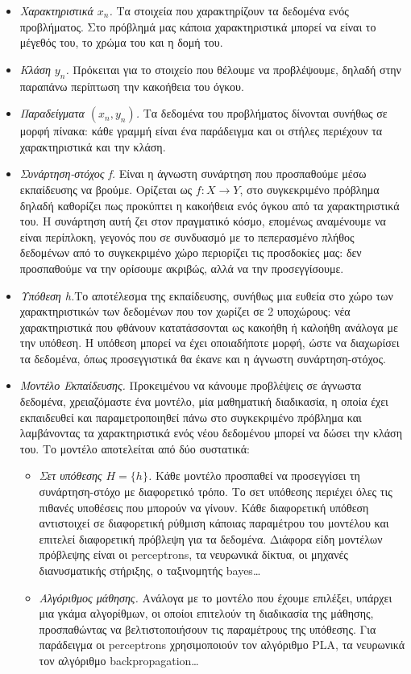 \documentclass{article}
\begin{document}
\begin{itemize}
\item \textit{Χαρακτηριστικά $x_n$.} Τα στοιχεία που χαρακτηρίζουν τα δεδομένα ενός προβλήματος. Στο πρόβλημά μας κάποια χαρακτηριστικά μπορεί να είναι το μέγεθός του, το χρώμα του και η δομή του.
\item \textit{Κλάση $y_n$.} Πρόκειται για το στοιχείο που θέλουμε να προβλέψουμε, δηλαδή στην παραπάνω περίπτωση την κακοήθεια του όγκου.
\item \textit{Παραδείγματα $(x_n, y_n)$.} Τα δεδομένα του προβλήματος δίνονται συνήθως σε μορφή πίνακα: κάθε γραμμή είναι ένα παράδειγμα και οι στήλες περιέχουν τα χαρακτηριστικά και την κλάση.
\item \textit{Συνάρτηση-στόχος f. }Είναι η άγνωστη συνάρτηση που προσπαθούμε μέσω εκπαίδευσης να βρούμε. Ορίζεται ως $f : X \rightarrow Y $, στο συγκεκριμένο πρόβλημα δηλαδή καθορίζει πως προκύπτει η κακοήθεια ενός όγκου από τα χαρακτηριστικά του. Η συνάρτηση αυτή ζει στον πραγματικό κόσμο, επομένως αναμένουμε να είναι περίπλοκη, γεγονός που σε συνδυασμό με το πεπερασμένο πλήθος δεδομένων από το συγκεκριμένο χώρο περιορίζει τις προσδοκίες μας: δεν προσπαθούμε να την ορίσουμε ακριβώς, αλλά να την προσεγγίσουμε.
\item \textit{Υπόθεση h.}Το αποτέλεσμα της εκπαίδευσης, συνήθως μια ευθεία στο χώρο των χαρακτηριστικών των δεδομένων που τον χωρίζει σε 2 υποχώρους: νέα χαρακτηριστικά που φθάνουν κατατάσσονται ως κακοήθη ή καλοήθη ανάλογα με την υπόθεση. Η υπόθεση μπορεί να έχει οποιαδήποτε μορφή, ώστε να διαχωρίσει τα δεδομένα, όπως προσεγγιστικά θα έκανε και η άγνωστη συνάρτηση-στόχος.
\item \textit{Μοντέλο Εκπαίδευσης.} Προκειμένου να κάνουμε προβλέψεις σε άγνωστα δεδομένα, χρειαζόμαστε ένα μοντέλο, μία μαθηματική διαδικασία, η οποία έχει εκπαιδευθεί και παραμετροποιηθεί πάνω στο συγκεκριμένο πρόβλημα και λαμβάνοντας τα χαρακτηριστικά ενός νέου δεδομένου μπορεί να δώσει την κλάση του. Το μοντέλο αποτελείται από δύο συστατικά:
\begin{itemize}
\item \textit{Σετ υπόθεσης $H = \{h\}$.} Κάθε μοντέλο προσπαθεί να προσεγγίσει τη συνάρτηση-στόχο με διαφορετικό τρόπο. Το σετ υπόθεσης περιέχει όλες τις πιθανές υποθέσεις που μπορούν να γίνουν. Κάθε διαφορετική υπόθεση αντιστοιχεί σε διαφορετική ρύθμιση κάποιας παραμέτρου του μοντέλου και επιτελεί διαφορετική πρόβλεψη για τα δεδομένα.  Διάφορα είδη μοντέλων πρόβλεψης είναι οι perceptrons, τα νευρωνικά δίκτυα, οι μηχανές διανυσματικής στήριξης, ο ταξινομητής bayes…
\item \textit{Αλγόριθμος μάθησης.} Ανάλογα με το μοντέλο που έχουμε επιλέξει, υπάρχει μια γκάμα αλγορίθμων, οι οποίοι επιτελούν τη διαδικασία της μάθησης, προσπαθώντας να βελτιστοποιήσουν τις παραμέτρους της υπόθεσης. Για παράδειγμα οι perceptrons χρησιμοποιούν τον αλγόριθμο PLA, τα νευρωνικά τον αλγόριθμο backpropagation…
\end{itemize}
\end{itemize}
\end{document}
